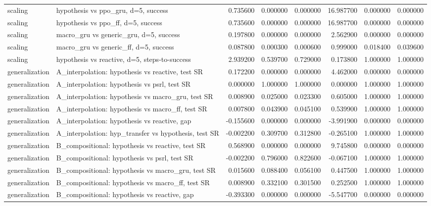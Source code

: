 \begin{tabular}{llrrrrrr}
scaling & hypothesis vs ppo\_gru, d=5, success & 0.735600 & 0.000000 & 0.000000 & 16.987700 & 0.000000 & 0.000000 \\
scaling & hypothesis vs ppo\_ff, d=5, success & 0.735600 & 0.000000 & 0.000000 & 16.987700 & 0.000000 & 0.000000 \\
scaling & macro\_gru vs generic\_gru, d=5, success & 0.197800 & 0.000000 & 0.000000 & 2.562900 & 0.000000 & 0.000000 \\
scaling & macro\_gru vs generic\_ff, d=5, success & 0.087800 & 0.000300 & 0.000600 & 0.999000 & 0.018400 & 0.039600 \\
scaling & hypothesis vs reactive, d=5, steps-to-success & 2.939200 & 0.539700 & 0.729000 & 0.173800 & 1.000000 & 1.000000 \\
generalization & A\_interpolation: hypothesis vs reactive, test SR & 0.172200 & 0.000000 & 0.000000 & 4.462000 & 0.000000 & 0.000000 \\
generalization & A\_interpolation: hypothesis vs psrl, test SR & 0.000000 & 1.000000 & 1.000000 & 0.000000 & 1.000000 & 1.000000 \\
generalization & A\_interpolation: hypothesis vs macro\_gru, test SR & 0.008900 & 0.025000 & 0.023300 & 0.605000 & 1.000000 & 1.000000 \\
generalization & A\_interpolation: hypothesis vs macro\_ff, test SR & 0.007800 & 0.043900 & 0.045100 & 0.539900 & 1.000000 & 1.000000 \\
generalization & A\_interpolation: hypothesis vs reactive, gap & -0.155600 & 0.000000 & 0.000000 & -3.991900 & 0.000000 & 0.000000 \\
generalization & A\_interpolation: hyp\_transfer vs hypothesis, test SR & -0.002200 & 0.309700 & 0.312800 & -0.265100 & 1.000000 & 1.000000 \\
generalization & B\_compositional: hypothesis vs reactive, test SR & 0.568900 & 0.000000 & 0.000000 & 9.745800 & 0.000000 & 0.000000 \\
generalization & B\_compositional: hypothesis vs psrl, test SR & -0.002200 & 0.796000 & 0.822600 & -0.067100 & 1.000000 & 1.000000 \\
generalization & B\_compositional: hypothesis vs macro\_gru, test SR & 0.015600 & 0.088400 & 0.056100 & 0.447500 & 1.000000 & 1.000000 \\
generalization & B\_compositional: hypothesis vs macro\_ff, test SR & 0.008900 & 0.332100 & 0.301500 & 0.252500 & 1.000000 & 1.000000 \\
generalization & B\_compositional: hypothesis vs reactive, gap & -0.393300 & 0.000000 & 0.000000 & -5.547700 & 0.000000 & 0.000000 \\

\end{tabular}
